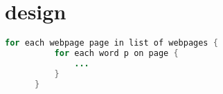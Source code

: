 \section{design}

\lipsum[2-1]

\begin{lstlisting}[language=Java]
      for each webpage page in list of webpages {
          for each word p on page {
              ...
          }
      }
\end{lstlisting}